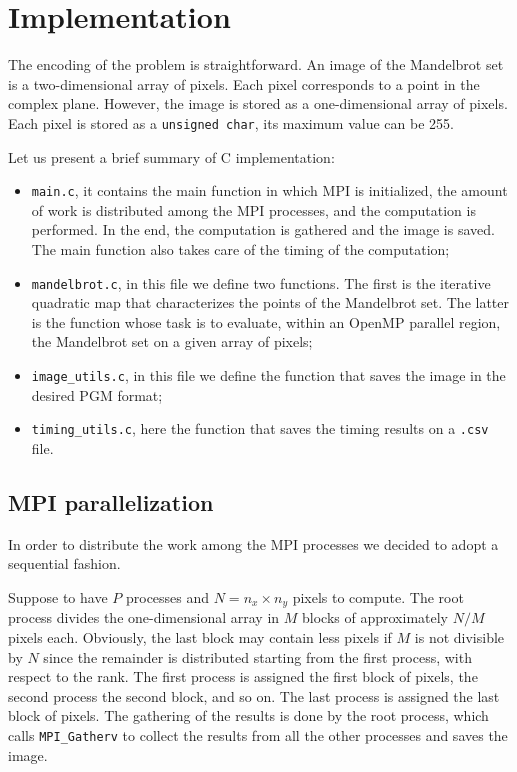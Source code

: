 \section{Implementation}

The encoding of the problem is straightforward. An image of the Mandelbrot set is a two-dimensional array of pixels. Each pixel corresponds to a point in the complex plane. However, the image is stored as a one-dimensional array of pixels. Each pixel is stored as a \texttt{unsigned char}, its maximum value can be 255.

Let us present a brief summary of C implementation:
\begin{itemize}
    \item \texttt{main.c}, it contains the main function in which MPI is initialized, the amount of work is distributed among the MPI processes, and the computation is performed. In the end, the computation is gathered and the image is saved. The main function also takes care of the timing of the computation;
    \item \texttt{mandelbrot.c}, in this file we define two functions. The first is the iterative quadratic map that characterizes the points of the Mandelbrot set. The latter is  the function whose task is to evaluate, within an OpenMP parallel region, the Mandelbrot set on a given array of pixels;
    \item \texttt{image\_utils.c}, in this file we define the function that saves the image in the desired PGM format;
    \item \texttt{timing\_utils.c}, here the function that saves the timing results on a \texttt{.csv} file.
\end{itemize}

\subsection{MPI parallelization}

In order to distribute the work among the MPI processes we decided to adopt a sequential fashion.

Suppose to have $P$ processes and $N = n_x \times n_y$ pixels to compute. The root process divides the one-dimensional array in $M$ blocks of approximately $N/M$ pixels each. Obviously, the last block may contain less pixels if $M$ is not divisible by $N$ since the remainder is distributed starting from the first process, with respect to the rank. The first process is assigned the first block of pixels, the second process the second block, and so on. The last process is assigned the last block of pixels. The gathering of the results is done by the root process, which calls \texttt{MPI\_Gatherv} to collect the results from all the other processes and saves the image.

